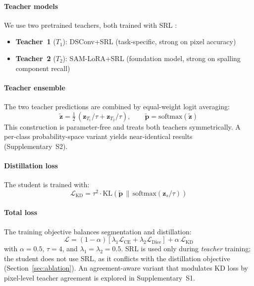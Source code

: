\documentclass[review,authoryear]{elsarticle}
\begin{document}
\paragraph{Teacher models} We use two pretrained teachers, both trained with SRL \citep{kirchhoff2024skeleton}:
\begin{itemize}[nosep]
    \item \textbf{Teacher~1} ($T_1$): DSConv+SRL (task-specific, strong on pixel accuracy)
    \item \textbf{Teacher~2} ($T_2$): SAM-LoRA+SRL (foundation model, strong on spalling component recall)
\end{itemize}

\paragraph{Teacher ensemble}
The two teacher predictions are combined by equal-weight logit averaging:
\begin{equation}
    \tilde{\mathbf{z}} = \tfrac{1}{2}\,(\mathbf{z}_{T_1} / \tau + \mathbf{z}_{T_2} / \tau), \qquad
    \tilde{\mathbf{p}} = \text{softmax}(\tilde{\mathbf{z}})
    \label{eq:dtkd_ensemble}
\end{equation}
This construction is parameter-free and treats both teachers symmetrically. A per-class probability-space variant yields near-identical results (Supplementary~S2).

\paragraph{Distillation loss} The student is trained with:
\begin{equation}
    \mathcal{L}_{\text{KD}} = \tau^2 \cdot \text{KL}\!\left(\tilde{\mathbf{p}} \,\|\, \text{softmax}(\mathbf{z}_s / \tau)\right)
    \label{eq:kd_loss}
\end{equation}

\paragraph{Total loss} The training objective balances segmentation and distillation:
\begin{equation}
    \mathcal{L} = (1-\alpha) \left[\lambda_1 \mathcal{L}_{\text{CE}} + \lambda_2 \mathcal{L}_{\text{Dice}}\right] + \alpha \, \mathcal{L}_{\text{KD}}
    \label{eq:total_loss}
\end{equation}
with $\alpha = 0.5$, $\tau = 4$, and $\lambda_1 = \lambda_2 = 0.5$.
SRL is used only during \emph{teacher} training; the student does not use SRL, as it conflicts with the distillation objective (Section~\ref{sec:ablation}).
An agreement-aware variant that modulates KD loss by pixel-level teacher agreement is explored in Supplementary~S1.
\end{document}
